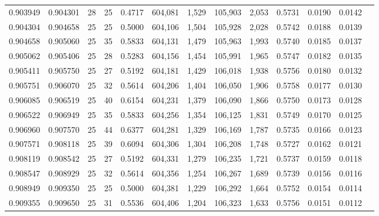 \begin{tabular}{rrrrrrrrrrrrr}
0.903949 & 0.904301 &    28 &  25 &                                     0.4717 & 604,081 &   1,529 & 105,903 &   2,053 & 0.5731 & 0.0190 & 0.0142 \\
0.904304 & 0.904658 &    25 &  25 &                                     0.5000 & 604,106 &   1,504 & 105,928 &   2,028 & 0.5742 & 0.0188 & 0.0139 \\
0.904658 & 0.905060 &    25 &  35 &                                     0.5833 & 604,131 &   1,479 & 105,963 &   1,993 & 0.5740 & 0.0185 & 0.0137 \\
0.905062 & 0.905406 &    25 &  28 &                                     0.5283 & 604,156 &   1,454 & 105,991 &   1,965 & 0.5747 & 0.0182 & 0.0135 \\
0.905411 & 0.905750 &    25 &  27 &                                     0.5192 & 604,181 &   1,429 & 106,018 &   1,938 & 0.5756 & 0.0180 & 0.0132 \\
0.905751 & 0.906070 &    25 &  32 &                                     0.5614 & 604,206 &   1,404 & 106,050 &   1,906 & 0.5758 & 0.0177 & 0.0130 \\
0.906085 & 0.906519 &    25 &  40 &                                     0.6154 & 604,231 &   1,379 & 106,090 &   1,866 & 0.5750 & 0.0173 & 0.0128 \\
0.906522 & 0.906949 &    25 &  35 &                                     0.5833 & 604,256 &   1,354 & 106,125 &   1,831 & 0.5749 & 0.0170 & 0.0125 \\
0.906960 & 0.907570 &    25 &  44 &                                     0.6377 & 604,281 &   1,329 & 106,169 &   1,787 & 0.5735 & 0.0166 & 0.0123 \\
0.907571 & 0.908118 &    25 &  39 &                                     0.6094 & 604,306 &   1,304 & 106,208 &   1,748 & 0.5727 & 0.0162 & 0.0121 \\
0.908119 & 0.908542 &    25 &  27 &                                     0.5192 & 604,331 &   1,279 & 106,235 &   1,721 & 0.5737 & 0.0159 & 0.0118 \\
0.908547 & 0.908929 &    25 &  32 &                                     0.5614 & 604,356 &   1,254 & 106,267 &   1,689 & 0.5739 & 0.0156 & 0.0116 \\
0.908949 & 0.909350 &    25 &  25 &                                     0.5000 & 604,381 &   1,229 & 106,292 &   1,664 & 0.5752 & 0.0154 & 0.0114 \\
0.909355 & 0.909650 &    25 &  31 &                                     0.5536 & 604,406 &   1,204 & 106,323 &   1,633 & 0.5756 & 0.0151 & 0.0112 \\

\end{tabular}
